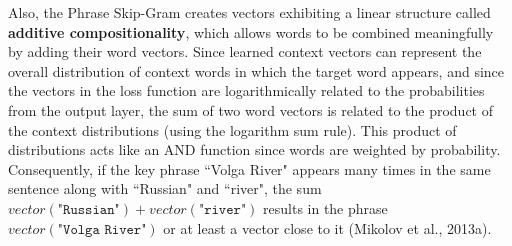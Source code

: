 Also, the Phrase Skip-Gram creates vectors exhibiting a linear structure called \textbf{additive compositionality}, which allows words to be combined meaningfully by adding their word vectors. Since learned context vectors can represent the overall distribution of context words in which the target word appears, and since the vectors in the loss function are logarithmically related to the probabilities from the output layer, the sum of two word vectors is related to the product of the context distributions (using the logarithm sum rule). This product of distributions acts like an AND function since words are weighted by probability. Consequently, if the key phrase ``Volga River" appears many times in the same sentence along with ``Russian" and ``river", the sum $vector(\texttt{"Russian"}) \! + \! vector(\texttt{"river"})$ results in the phrase $vector(\texttt{"Volga River"})$ or at least a vector close to it (Mikolov et al., 2013a). 
